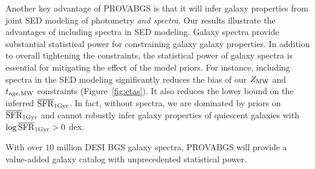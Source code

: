 Another key advantage of {\sc PROVABGS} is that it will infer galaxy
properties from joint SED modeling of photometry \emph{and spectra}. 
Our results illustrate the advantages of including spectra in SED modeling. 
Galaxy spectra provide substantial statistical power for constraining galaxy
galaxy properties. 
In addition to overall tightening the constraints, the statistical power of
galaxy spectra is essential for mitigating the effect of the model priors. 
For instance, including spectra in the SED modeling significantly reduces the
bias of our $Z_{\rm MW}$ and $t_{\rm age, MW}$ constraints (Figure~\ref{fig:etas}). 
It also reduces the lower bound on the inferred $\overline{\rm SFR}_{\rm 1Gyr}$. 
In fact, without spectra, we are dominated by priors on $\overline{\rm SFR}_{\rm 1Gyr}$ and cannot
robustly infer galaxy properties of quiescent galaxies with $\log\overline{\rm SFR}_{\rm 1Gyr} > 0$
dex.

With over $10$ million DESI BGS galaxy spectra, {\sc PROVABGS} will provide a
value-added galaxy catalog with unprecedented statistical power. 

